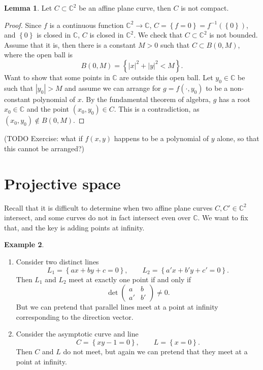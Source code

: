 \documentclass{article}
\newcommand{\C}{\mathbb{C}}
\newcommand{\rb}[1]{\left( #1 \right)}
\newcommand{\cb}[1]{\left\{ #1 \right\}}
\newcommand{\abs}[1]{\left\lvert #1 \right\rvert}
\newcommand{\two}[2]{\begin{pmatrix} #1 \\ #2 \end{pmatrix}}
\theoremstyle{definition}\newtheorem{definition}{Definition}[section]
\theoremstyle{definition}\newtheorem{notation}[definition]{Notation}
\theoremstyle{definition}\newtheorem{remark}[definition]{Remark}
\theoremstyle{definition}\newtheorem{example}[definition]{Example}
\theoremstyle{definition}\newtheorem{fact}{Fact}
\theoremstyle{definition}\newtheorem{exercise}{Exercise}
\newtheorem{lemma}[definition]{Lemma}
\begin{document}
\begin{lemma}
Let $ C \subset \C^2 $ be an affine plane curve, then $ C $ is not compact.
\end{lemma}

\begin{proof}
Since $ f $ is a continuous function $ \C^2 \to \C $, $ C = \cb{f = 0} = f^{-1}\rb{\cb{0}} $, and $ \cb{0} $ is closed in $ \C $, $ C $ is closed in $ \C^2 $. We check that $ C \subset \C^2 $ is not bounded. Assume that it is, then there is a constant $ M > 0 $ such that $ C \subset B\rb{0, M} $, where the open ball is
$$ B\rb{0, M} = \cb{\abs{x}^2 + \abs{y}^2 < M}. $$
Want to show that some points in $ \C $ are outside this open ball. Let $ y_0 \in \C $ be such that $ \abs{y_0} > M $ and assume we can arrange for $ g = f\rb{\cdot, y_0} $ to be a non-constant polynomial of $ x $. By the fundamental theorem of algebra, $ g $ has a root $ x_0 \in \C $ and the point $ \rb{x_0, y_0} \in C $. This is a contradiction, as $ \rb{x_0, y_0} \notin B\rb{0, M} $.
\end{proof}

(TODO Exercise: what if $ f\rb{x, y} $ happens to be a polynomial of $ y $ alone, so that this cannot be arranged?)


\section{Projective space}

Recall that it is difficult to determine when two affine plane curves $ C, C' \in \C^2 $ intersect, and some curves do not in fact intersect even over $ \C $. We want to fix that, and the key is adding points at infinity.

\begin{example}
\hfill
\begin{enumerate}
\item Consider two distinct lines
$$ L_1 = \cb{ax + by + c = 0}, \qquad L_2 = \cb{a'x + b'y + c' = 0}. $$
Then $ L_1 $ and $ L_2 $ meet at exactly one point if and only if
$$ \det\two{a & b}{a' & b'} \ne 0. $$
But we can pretend that parallel lines meet at a point at infinity corresponding to the direction vector.
\item Consider the asymptotic curve and line
$$ C = \cb{xy - 1 = 0}, \qquad L = \cb{x = 0}. $$
Then $ C $ and $ L $ do not meet, but again we can pretend that they meet at a point at infinity.
\end{enumerate}
\end{example}
\end{document}
